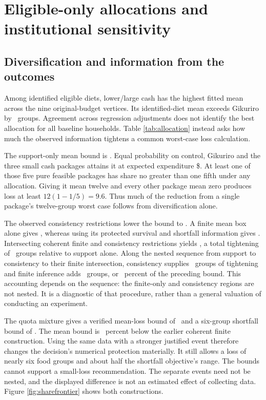 \documentclass[11pt]{article}
\begin{document}
\section{Eligible-only allocations and institutional sensitivity}\label{app:eligibleallocation}

\subsection{Diversification and information from the outcomes}

Among identified eligible diets, lower/large cash has the highest fitted mean across the nine original-budget vertices. Its identified-diet mean exceeds Gikuriro by \GKFittedRegret\ groups. Agreement across regression adjustments does not identify the best allocation for all baseline households. Table \ref{tab:allocation} instead asks how much the observed information tightens a common worst-case loss calculation.



The support-only mean bound is \SupportMeanLoss. Equal probability on control, Gikuriro and the three small cash packages attains it at expected expenditure \$\NoOutcomeCost. At least one of those five pure feasible packages has share no greater than one fifth under any allocation. Giving it mean twelve and every other package mean zero produces loss at least $12(1-1/5)=9.6$. Thus much of the reduction from a single package's twelve-group worst case follows from diversification alone.

The observed consistency restrictions lower the bound to \LogicalMeanLoss. A finite mean box alone gives \FiniteMeanAllocation, whereas using its protected survival and shortfall information gives \ProjectedMeanLoss. Intersecting coherent finite and consistency restrictions yields \TightMeanLoss, a total tightening of \TotalInformationTightening\ groups relative to support alone. Along the nested sequence from support to consistency to their finite intersection, consistency supplies \ConsistencyTightening\ groups of tightening and finite inference adds \FiniteIncrementOverConsistency\ groups, or \FiniteIncrementPercent\ percent of the preceding bound. This accounting depends on the sequence: the finite-only and consistency regions are not nested. It is a diagnostic of that procedure, rather than a general valuation of conducting an experiment.

The quota mixture gives a verified mean-loss bound of \QuotaMeanLoss\ and a six-group shortfall bound of \QuotaShortfallLoss. The mean bound is \QuotaRelativeImprovement\ percent below the earlier coherent finite construction. Using the same data with a stronger justified event therefore changes the decision's numerical protection materially. It still allows a loss of nearly six food groups and about half the shortfall objective's range. The bounds cannot support a small-loss recommendation. The separate events need not be nested, and the displayed difference is not an estimated effect of collecting data. Figure \ref{fig:sharefrontier} shows both constructions.
\end{document}
